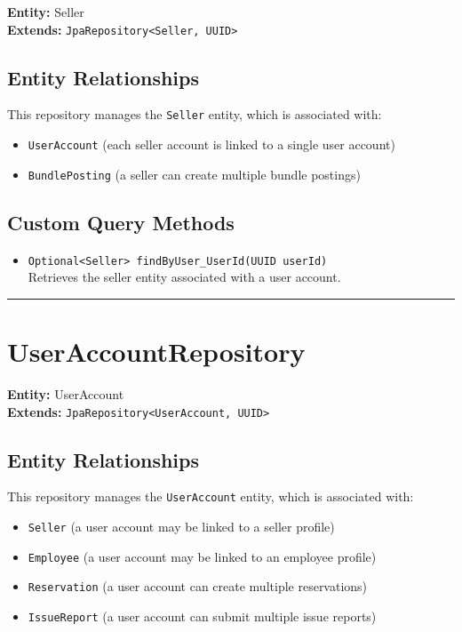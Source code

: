 \documentclass[12pt]{article}
\begin{document}
\textbf{Entity:} Seller \\
\textbf{Extends:} \texttt{JpaRepository<Seller, UUID>}

\subsection*{Entity Relationships}

This repository manages the \texttt{Seller} entity, which is associated with:

\begin{itemize}
    \item \texttt{UserAccount} (each seller account is linked to a single user account)
    \item \texttt{BundlePosting} (a seller can create multiple bundle postings)
\end{itemize}


\subsection*{Custom Query Methods}
\begin{itemize}
    \item \texttt{Optional<Seller> findByUser\_UserId(UUID userId)} \\
    Retrieves the seller entity associated with a user account.

\end{itemize}

\hrule
\vspace{1em}

\section{UserAccountRepository}

\textbf{Entity:} UserAccount \\
\textbf{Extends:} \texttt{JpaRepository<UserAccount, UUID>}

\subsection*{Entity Relationships}

This repository manages the \texttt{UserAccount} entity, which is associated with:

\begin{itemize}
    \item \texttt{Seller} (a user account may be linked to a seller profile)
    \item \texttt {Employee} (a user account may be linked to an employee profile)
    \item \texttt{Reservation} (a user account can create multiple reservations)
    \item \texttt{IssueReport} (a user account can submit multiple issue reports)
\end{itemize}
\end{document}
